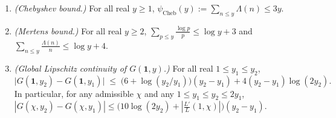 \begin{lemma}
\label{lem:03:elementary}
\leavevmode
\begin{enumerate}[label=\textup{(\roman*)}]
\item \emph{(Chebyshev bound.)} For all real $y \ge 1$, $\psi_{\mathrm{Cheb}}(y) := \sum_{n \le y} \Lambda(n) \le 3y$.
\item \emph{(Mertens bound.)} For all real $y \ge 2$, $\sum_{p \le y} \frac{\log p}{p} \le \log y + 3$ and $\sum_{n \le y} \frac{\Lambda(n)}{n} \le \log y + 4$.
\item \emph{(Global Lipschitz continuity of $G(\mathbf{1}, y)$.)} For all real $1 \le y_1 \le y_2$,
  \begin{equation}
  \label{eq:03:gz-lip}
    \bigl|G(\mathbf{1}, y_2) - G(\mathbf{1}, y_1)\bigr| \;\le\; \bigl(6 + \log(y_2/y_1)\bigr)(y_2 - y_1) + 4(y_2 - y_1)\log(2y_2).
  \end{equation}
  In particular, for any admissible $\chi$ and any $1 \le y_1 \le y_2 \le 2y_1$, $|G(\chi, y_2) - G(\chi, y_1)| \le \bigl(10\log(2y_2) + |\frac{L'}{L}(1,\chi)|\bigr)(y_2 - y_1)$.
\end{enumerate}
\end{lemma}

